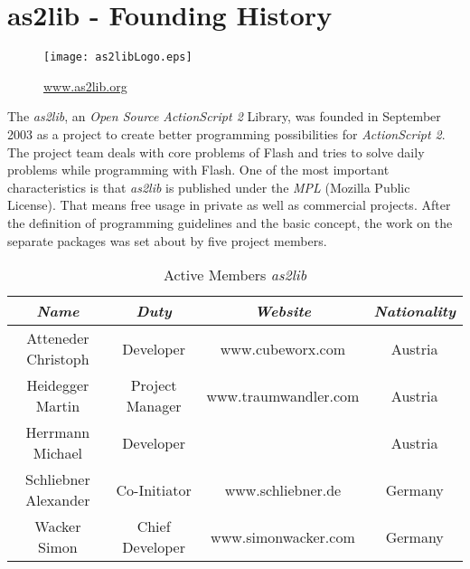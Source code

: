 \chapter{as2lib - Founding History}
\label{sec:Entstehungsgeschichte}

\begin{figure}
\begin{center}
\texttt{[image: as2libLogo.eps]}
\label{fig:as2libLogo}
\caption{\href{http://www.as2lib.org}{www.as2lib.org}}
\end{center}
\end{figure}

The {\sl as2lib}, an \emph{Open Source} {\sl ActionScript 2} Library, was founded in September 2003 as a project to create better programming possibilities for {\sl ActionScript 2}. The project team deals with core problems of Flash and tries to solve daily problems while programming with Flash.
One of the most important characteristics is that {\sl as2lib} is published under the \emph{MPL} (Mozilla Public License). That means free usage in private as well as commercial projects. After the definition of programming guidelines and the basic concept, the work on the separate packages was set about by five project members.
\begin{table*}[h]
	\centering
		\begin{tabular}{|c||c||c||c|} \hline
				{\em Name} & {\em Duty} & {\em Website} & {\em Nationality}\\
				\hline\hline
				Atteneder Christoph & Developer & www.cubeworx.com & Austria\\
				Heidegger Martin & Project Manager & www.traumwandler.com & Austria\\
				Herrmann Michael & Developer & & Austria\\
				Schliebner Alexander & Co-Initiator & www.schliebner.de & Germany\\
				Wacker Simon & Chief Developer & www.simonwacker.com & Germany\\
				\hline\hline
		\end{tabular}
	\caption{Active Members {\sl as2lib}}
	\label{tab:as2libmembers}
\end{table*}

